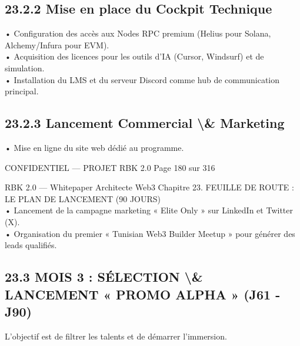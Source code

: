 \documentclass[12pt,landscape,a4paper]{article}
\newenvironment{confidential}
{\begin{tcolorbox}[
    colback=rbkred!5!white,
    colframe=rbkred!75!black,
    title=CONFIDENTIEL,
    fonttitle=\bfseries\color{white},
    coltitle=rbkred!75!black,
    breakable,
    enhanced,
    frame hidden,
    borderline west={2pt}{0pt}{rbkred!75!black}
]}
{\end{tcolorbox}}
\begin{document}
\subsection{23.2.2 Mise en place du Cockpit Technique}
• Configuration des accès aux Nodes RPC premium (Helius pour Solana, Alchemy/Infura pour EVM).\\
\vspace{0.5em}
• Acquisition des licences pour les outils d’IA (Cursor, Windsurf) et de simulation.\\
\vspace{0.5em}
• Installation du LMS et du serveur Discord comme hub de communication principal.\\
\vspace{0.5em}
\vspace{0.5em}
\subsection{23.2.3 Lancement Commercial \textbackslash{}& Marketing}
• Mise en ligne du site web dédié au programme.\\
\vspace{0.5em}
\vspace{0.5em}
\vspace{0.5em}
\begin{confidential}CONFIDENTIEL — PROJET RBK 2.0                                  Page 180 sur 316\end{confidential}
RBK 2.0 — Whitepaper Architecte Web3                                   Chapitre 23. FEUILLE DE ROUTE : LE PLAN DE LANCEMENT (90 JOURS)\\
\vspace{0.5em}
\vspace{0.5em}
• Lancement de la campagne marketing « Elite Only » sur LinkedIn et Twitter (X).\\
\vspace{0.5em}
• Organisation du premier « Tunisian Web3 Builder Meetup » pour générer des leads qualifiés.\\
\vspace{0.5em}
\vspace{0.5em}
\subsection{23.3 MOIS 3 : SÉLECTION \textbackslash{}& LANCEMENT « PROMO ALPHA » (J61 - J90)}
L’objectif est de filtrer les talents et de démarrer l’immersion.\\
\vspace{0.5em}
\vspace{0.5em}
\end{document}
